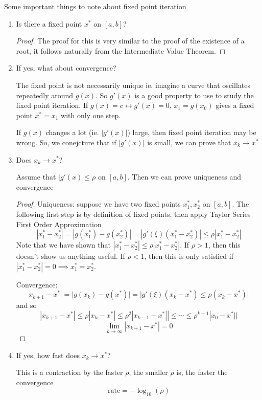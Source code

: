 \documentclass[12pt]{scrartcl}
\begin{document}
\begin{note}
  Some important things to note about fixed point iteration

  \begin{enumerate}
    \item Is there a fixed point $x^*$ on $[a,b]$?
    
    \begin{proof}
      The proof for this is very similar to the proof of the existence of a root, it follows 
      naturally from the Intermediate Value Theorem. 
    \end{proof}
    \item If yes, what about convergence?
    
    The fixed point is not necessarily unique ie. imagine a curve that oscillates repeatedly around $g(x)$. 
    So $g'(x)$ is a good property to use to study the fixed point iteration. If $g(x) = c \longleftrightarrow g'(x) = 0$, 
    $x_1 = g(x_0)$ gives a fixed point $x^* = x_1$ with only one step.

    If $g(x)$ changes a lot (ie. $|g'(x)|$) large, then fixed point iteration may be wrong. 
    So, we conejcture that if $|g'(x)|$ is small, we can prove that $x_k \to x^*$
    
    \item Does $x_k \to x^*$?

      Assume that $|g'(x) \leq \rho$ on $[a,b]$. Then we can prove uniqueness and convergence  

      \begin{proof}
        
        Uniqueness: suppose we have two fixed points $x_1^*, x_2^*$ on $[a,b]$. The following 
        first step is by definition of fixed points, then apply Taylor Series First Order Approximation
        \[|x_1^* - x_2^*| = |g(x_1^*) - g(x_2^*)| = |g'(\xi)(x_1^* - x_2^*)| \leq \rho|x_1^* - x_2^*|\]
        Note that we have shown that $|x_1^* - x_2^*| \leq \rho |x_1^* - x_2^*|$. If $\rho > 1$, then this doesn't show 
        us anything useful. If $\rho < 1$, then this is only satisfied if $|x_1^* - x_2^*| = 0 \implies x_1^* = x_2^*$.

        \hfill

        Convergence: 
        \[x_{k+1} - x^*| = |g(x_k) - g(x^*)| = |g'(\xi)(x_k - x^*) \leq \rho(x_k - x^*)|\]
        and so 
        \[|x_{k+1} - x^*| \leq \rho |x_k - x^*| \leq \rho^2 |x_{k-1} - x^*|| \leq \cdots \leq \rho^{k+1}|x_0 - x^*||\]
        \[\lim_{k\to\infty} |x_{k+1} - x^*| = 0\]
      \end{proof}
    
    \item If yes, how fast does $x_k \to x^*$?
    
      This is a contraction by the faster $\rho$, the smaller $\rho$ is, the faster the convergence 
      \[\text{rate} = -\log_{10}(\rho)\]

  \end{enumerate}
\end{note}
\end{document}
